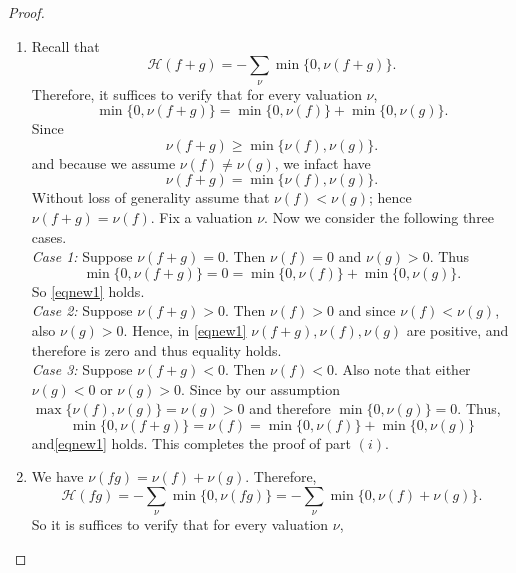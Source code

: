 \documentclass[10pt,a4paper]{amsart}
\begin{document}
    \begin{proof}
        \begin{enumerate}
            \item[($i$)] Recall that
            \[\mathcal{H}(f+g)=- \sum_{\nu} \min \{ 0,\nu (f+g)\}.\]
            Therefore, it suffices to verify that for every valuation $\nu$, 
            \begin{equation}\label{eqnew1}
                \min \{ 0,\nu (f+g)\}=\min \{ 0,\nu (f)\}+\min \{ 0,\nu (g)\}.
            \end{equation} Since 
            \begin{equation*}
                \nu(f+g)\geq \min\{\nu(f),\nu(g)\}.
            \end{equation*}and because we assume $\nu(f)\neq \nu(g)$, we infact have 
            \begin{equation*}
                \nu(f+g)= \min\{\nu(f),\nu(g)\}.
            \end{equation*} Without loss of generality assume that $\nu(f)<\nu(g)$; hence $\nu(f+g)=\nu(f)$. Fix a valuation $\nu$. Now we consider the following three cases.\\
            \textit{Case 1:} Suppose  $\nu(f+g)=0.$ Then $\nu(f)=0$ and $\nu(g)>0$. Thus
            \[
            \min \{0, \nu(f+g)\}=0=\min \{0, \nu(f)\}+\min \{0, \nu(g)\}.
            \]  So \eqref{eqnew1} holds.\\
            \textit{Case 2:} Suppose $\nu(f+g)>0$. Then $\nu(f)>0$ and since $\nu(f)<\nu(g)$, also $\nu(g)>0$. Hence, in \eqref{eqnew1} $\nu(f+g),\nu(f),\nu(g)$ are positive, and therefore is zero and thus equality holds.\\
            \textit{Case 3:} Suppose $\nu(f+g)<0$. Then $\nu(f)<0$. Also note that either $\nu(g)<0$ or $\nu(g)>0$. Since by our assumption $\max \{\nu(f), \nu(g)\}=\nu(g)>0$ and therefore $\min \{0,\nu (g)\}=0$. Thus,
            \[
            \min\{0,\nu(f+g)\}=\nu(f)=\min\{0,\nu(f)\}+\min\{0,\nu(g)\}
            \]and\eqref{eqnew1} holds. This completes the proof of part $(i)$.
            \item[($ii$)] We have $\nu(fg)=\nu(f)+\nu(g)$. Therefore,
            \begin{equation*}
                \mathcal{H}(fg)=-\sum_{\nu} \min \{0,\nu(fg)\}= -\sum_{\nu} \min \{0,\nu(f)+\nu(g)\}. 
            \end{equation*} So it is suffices to verify that for every valuation $\nu$,
            \begin{equation}\label{eqnew2}

\end{equation}
\end{enumerate}
\end{proof}
\end{document}
